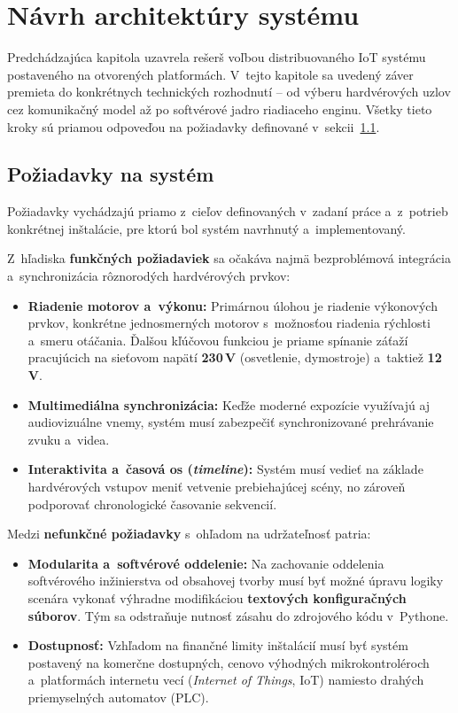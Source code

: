 \chapter{Návrh architektúry systému}
\label{NavrhArchitektury}

Predchádzajúca kapitola uzavrela rešerš voľbou distribuovaného
IoT systému postaveného na otvorených platformách.
V~tejto kapitole sa uvedený záver premieta do konkrétnych
technických rozhodnutí -- od výberu hardvérových uzlov
cez komunikačný model až po softvérové jadro riadiaceho enginu.
Všetky tieto kroky sú priamou odpoveďou na požiadavky
definované v~sekcii~\ref{PoziadavkyNaSystem}.

\section{Požiadavky na systém}
\label{PoziadavkyNaSystem}

Požiadavky vychádzajú priamo z~cieľov definovaných
v~zadaní práce a~z~potrieb konkrétnej inštalácie,
pre ktorú bol systém navrhnutý a~implementovaný.

Z~hľadiska \textbf{funkčných požiadaviek} sa očakáva najmä bezproblémová
integrácia a~synchronizácia rôznorodých hardvérových prvkov:
\begin{itemize}
    \item \textbf{Riadenie motorov a~výkonu:} Primárnou úlohou je riadenie
        výkonových prvkov, konkrétne jednosmerných motorov s~možnosťou riadenia
        rýchlosti a~smeru otáčania. Ďalšou kľúčovou funkciou je priame spínanie
        záťaží pracujúcich na sieťovom napätí \textbf{230\,V} (osvetlenie,
        dymostroje) a~taktiež \textbf{12\,V}.
    \item \textbf{Multimediálna synchronizácia:} Keďže moderné expozície
        využívajú aj audiovizuálne vnemy, systém musí zabezpečiť synchronizované
        prehrávanie zvuku a~videa.
    \item \textbf{Interaktivita a~časová os (\textit{timeline}):} Systém musí
        vedieť na základe hardvérových vstupov meniť vetvenie prebiehajúcej
        scény, no zároveň podporovať chronologické časovanie sekvencií.
\end{itemize}

Medzi \textbf{nefunkčné požiadavky} s~ohľadom na udržateľnosť patria:
\begin{itemize}
    \item \textbf{Modularita a~softvérové oddelenie:} Na zachovanie oddelenia
        softvérového inžinierstva od obsahovej tvorby musí byť možné úpravu
        logiky scenára vykonať výhradne modifikáciou \textbf{textových konfiguračných
        súborov}. Tým sa odstraňuje nutnosť zásahu do zdrojového kódu v~Pythone.
    \item \textbf{Dostupnosť:} Vzhľadom na finančné limity
        inštalácií musí byť systém postavený na komerčne dostupných, cenovo
        výhodných mikrokontroléroch a~platformách internetu vecí
        (\textit{Internet of Things}, IoT)
        namiesto drahých priemyselných automatov (PLC).
\end{itemize}

